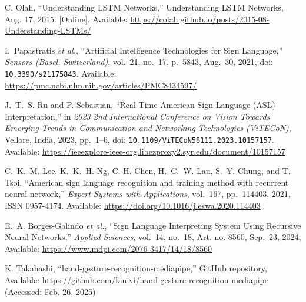 \documentclass[12pt]{article}
\begin{document}
\begin{thebibliography}{99}
C. Olah, 
“Understanding LSTM Networks,” 
Understanding LSTM Networks, Aug. 17, 2015. [Online].  
Available: \url{https://colah.github.io/posts/2015-08-Understanding-LSTMs/}

I.~Papastratis \emph{et al.}, 
“Artificial Intelligence Technologies for Sign Language,” 
\emph{Sensors (Basel, Switzerland)}, vol.~21, no.~17, p.~5843, Aug.~30, 2021, 
doi: \texttt{10.3390/s21175843}.   
Available: \url{https://pmc.ncbi.nlm.nih.gov/articles/PMC8434597/}

J.~T.~S. Ru and P. Sebastian, 
“Real-Time American Sign Language (ASL) Interpretation,” 
in \emph{2023 2nd International Conference on Vision Towards Emerging Trends in Communication and Networking Technologies (ViTECoN)}, 
Vellore, India, 2023, pp.~1--6, 
doi: \texttt{10.1109/ViTECoN58111.2023.10157157}. 
Available: \url{https://ieeexplore-ieee-org.libezproxy2.syr.edu/document/10157157}

C.~K.~M. Lee, K.~K.~H. Ng, C.-H. Chen, H.~C.~W. Lau, S.~Y. Chung, and T. Tsoi, 
“American sign language recognition and training method with recurrent neural network,” 
\textit{Expert Systems with Applications}, vol.~167, pp.~114403, 2021,  
ISSN 0957-4174.  
Available: \url{https://doi.org/10.1016/j.eswa.2020.114403} 

E.~A. Borges-Galindo \emph{et al.}, 
“Sign Language Interpreting System Using Recursive Neural Networks,” 
\emph{Applied Sciences}, vol.~14, no.~18, Art. no. 8560, Sep.~23, 2024,  
Available: \url{https://www.mdpi.com/2076-3417/14/18/8560}

K. Takahashi, “hand-gesture-recognition-mediapipe,” GitHub repository,  
Available: \url{https://github.com/kinivi/hand-gesture-recognition-mediapipe} (Accessed: Feb. 26, 2025)




\end{thebibliography}
\end{document}
